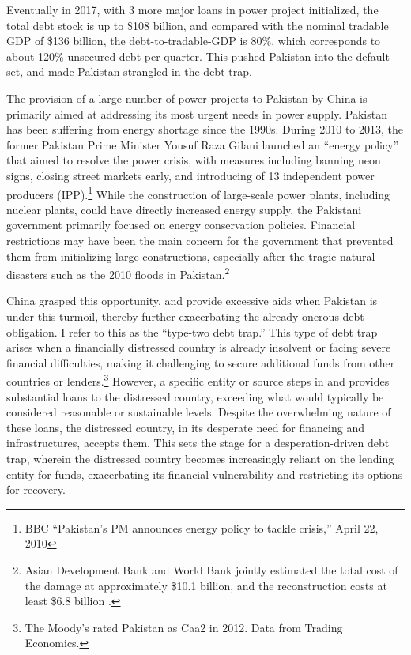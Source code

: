 Eventually in 2017, with 3 more major loans in power project initialized, the total debt stock is up to \$108 billion, and compared with the nominal tradable GDP of \$136 billion, the debt-to-tradable-GDP is 80\%, which corresponds to about 120\% unsecured debt per quarter. This pushed Pakistan into the default set, and made Pakistan strangled in the debt trap.

The provision of a large number of power projects to Pakistan by China is primarily aimed at addressing its most urgent needs in power supply. Pakistan has been suffering from energy shortage since the 1990s. During 2010 to 2013, the former Pakistan Prime Minister Yousuf Raza Gilani launched an ``energy policy'' that aimed to resolve the power crisis, with measures including banning neon signs, closing street markets early, and introducing of 13 independent power producers (IPP).\footnote{
    BBC ``Pakistan's PM announces energy policy to tackle crisis,'' April 22, 2010
}
While the construction of large-scale power plants, including nuclear plants, could have directly increased energy supply, the Pakistani government primarily focused on energy conservation policies. Financial restrictions may have been the main concern for the government that prevented them from initializing large constructions, especially after the tragic natural disasters such as the 2010 floods in Pakistan.\footnote{
    Asian Development Bank and World Bank jointly estimated the total cost of the damage at approximately \$10.1 billion, and the reconstruction costs at least \$6.8 billion \citep{pakistan-flood}.
}

China grasped this opportunity, and provide excessive aids when Pakistan is under this turmoil, thereby further exacerbating the already onerous debt obligation. I refer to this as the ``type-two debt trap.''
This type of debt trap arises when a financially distressed country is already insolvent or facing severe financial difficulties, making it challenging to secure additional funds from other countries or lenders.\footnote{
    The Moody's rated Pakistan as Caa2 in 2012. Data from Trading Economics.
}
However, a specific entity or source steps in and provides substantial loans to the distressed country, exceeding what would typically be considered reasonable or sustainable levels. Despite the overwhelming nature of these loans, the distressed country, in its desperate need for financing and infrastructures, accepts them. This sets the stage for a desperation-driven debt trap, wherein the distressed country becomes increasingly reliant on the lending entity for funds, exacerbating its financial vulnerability and restricting its options for recovery.

